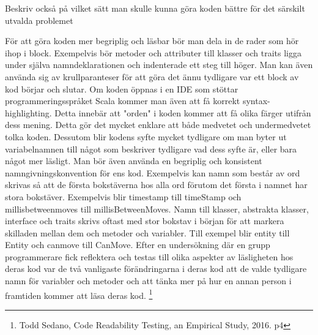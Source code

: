 Beskriv också på vilket sätt man skulle kunna göra koden bättre för det särskilt
utvalda problemet

För att göra koden mer begriplig och läsbar bör man dela in de rader som hör ihop i block. Exempelvis bör metoder och attributer till klasser och traits ligga under själva namndeklarationen och indenterade ett steg till höger. Man kan även använda sig av krullparanteser för att göra det ännu tydligare var ett block av kod börjar och slutar. Om koden öppnas i en IDE som stöttar programmeringsspråket Scala kommer man även att få korrekt syntax-highlighting. Detta innebär att "orden" i koden kommer att få olika färger utifrån dess mening. Detta gör det mycket enklare att både medvetet och undermedvetet tolka koden. Dessutom blir kodens syfte mycket tydligare om man byter ut variabelnamnen till något som beskriver tydligare vad dess syfte är, eller bara något mer läsligt. Man bör även använda en begriplig och konsistent namngivningskonvention för ens kod. Exempelvis kan namn som består av ord skrivas så att de första bokstäverna hos alla ord förutom det första i namnet har stora bokstäver. Exempelvis blir timestamp till timeStamp och millisbetweenmoves till millisBetweenMoves. Namn till klasser, abstrakta klasser, interface och traits skrivs oftast med stor bokstav i början för att markera skilladen mellan dem och metoder och variabler. Till exempel blir entity till Entity och canmove till CanMove. Efter en undersökning där en grupp programmerare fick reflektera och testas till olika aspekter av läsligheten hos deras kod var de två vanligaste förändringarna i deras kod att de valde tydligare namn för variabler och metoder och att tänka mer på hur en annan person i framtiden kommer att läsa deras kod. \footnote{Todd Sedano, Code Readability Testing, an Empirical Study, 2016. p4}
